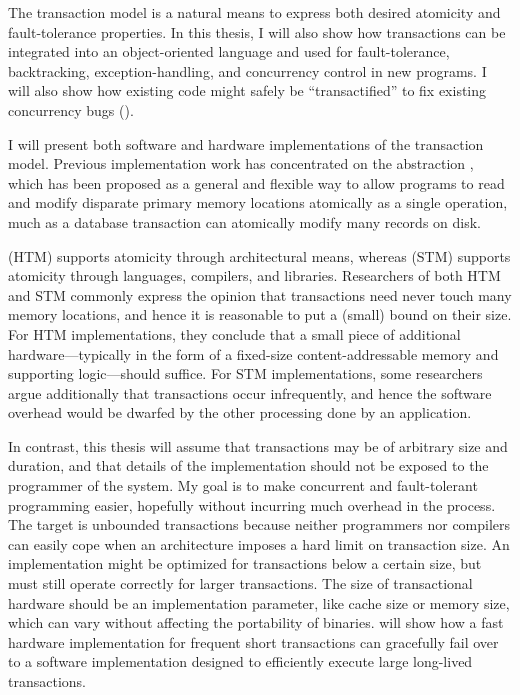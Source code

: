 The transaction model is a natural means to express both desired
atomicity and fault-tolerance properties.  In this thesis, I will also
show how transactions can be integrated into an object-oriented
language and used for fault-tolerance, backtracking,
exception-handling, and concurrency control in new programs.  I will
also show how
existing code might safely be ``transactified'' to fix existing
concurrency bugs ().

I will present both software and hardware implementations of the
transaction model.
Previous implementation work has concentrated on the
 abstraction
\cite{Knight86,HerlihyMo93,StoneStHe93,RajwarGo02,ShavitTo95,HerlihyLuMoSc03},
which has
been proposed as a general and flexible way to allow programs to read
and modify disparate primary memory locations atomically as a single
operation, much as a database transaction can atomically modify many
records on disk.

 (HTM) supports atomicity through
architectural means, whereas 
(STM) supports atomicity through languages, compilers, and libraries.
Researchers of both HTM and STM commonly express the opinion that
transactions need never touch many memory locations, and hence it is
reasonable to put a (small) bound on their size.  For HTM implementations,
they conclude that a small piece of additional hardware---typically in
the form of a fixed-size content-addressable memory and supporting
logic---should suffice.  For STM implementations, some researchers
argue additionally that transactions occur infrequently, and hence the
software overhead would be dwarfed by the other processing done by an
application.

In contrast, this thesis will assume that transactions may be of
arbitrary size and duration, and that details of the implementation
should not be exposed to the programmer of the system.  My goal is to
make concurrent and fault-tolerant programming easier, hopefully
without incurring much overhead in the process.  The target is
unbounded transactions because neither programmers nor compilers can
easily cope when an architecture imposes a hard limit on transaction
size.  An implementation might be optimized for transactions below a
certain size, but must still operate correctly for larger
transactions.  The size of transactional hardware should be an
implementation parameter, like cache size or memory size, which can
vary without affecting the portability of binaries.
 will show how a fast hardware implementation for
frequent short transactions can gracefully fail over to a software
implementation designed to efficiently execute large long-lived
transactions.

